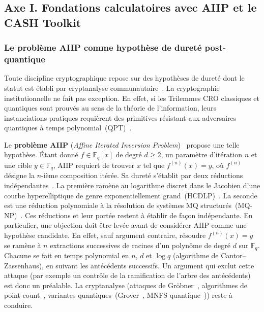 \subsection{Axe I. Fondations calculatoires avec AIIP et le CASH Toolkit}
\label{subsec:axe1_aiip_cash}
\begin{sloppypar}

\subsubsection{Le probl\`eme AIIP comme hypoth\`ese de duret\'e post-quantique}
\label{subsubsec:probleme_aiip}

Toute discipline cryptographique repose sur des hypoth\`eses de duret\'e dont
le statut est \'etabli par cryptanalyse
communautaire~\cite{Goldreich01,KatzLindell14}. La cryptographie
institutionnelle ne fait pas exception. En effet, si les Trilemmes CRO classiques et
quantiques sont prouv\'es au sens de la th\'eorie de l'information, leurs
instanciations pratiques requi\`erent des primitives r\'esistant aux
adversaires quantiques \`a temps polynomial~(QPT)~\cite{Boneh2011,Watrous2009}.

Le \textbf{probl\`eme AIIP} (\textit{Affine Iterated Inversion
Problem})~\cite{MINKA2025AIIP} propose une telle hypoth\`ese. \'Etant
donn\'e $f \in \mathbb{F}_q[x]$ de degr\'e $d \geq 2$, un param\`etre
d'it\'eration $n$ et une cible $y \in \mathbb{F}_q$, AIIP requiert de trouver
$x$ tel que $f^{(n)}(x) = y$, o\`u $f^{(n)}$ d\'esigne la $n$-i\`eme
composition it\'er\'ee. Sa duret\'e s'\'etablit par deux r\'eductions
ind\'ependantes~\cite{MINKA2025AIIP}. La premi\`ere ram\`ene au logarithme discret dans
le Jacobien d'une courbe hyperelliptique de genre exponentiellement
grand~(HCDLP)~\cite{Menezes2001,Enge2002}. La seconde est une r\'eduction polynomiale \`a la
r\'esolution de syst\`emes MQ structur\'es~(MQ-NP)~\cite{Courtois2000,Ding2004}.
Ces r\'eductions et leur port\'ee restent \`a \'etablir de fa\c{c}on
ind\'ependante. En particulier, une objection doit \^etre lev\'ee avant de
consid\'erer AIIP comme une hypoth\`ese candidate. En effet, sauf argument contraire,
r\'esoudre $f^{(n)}(x) = y$ se ram\`ene \`a $n$ extractions successives de racines
d'un polyn\^ome de degr\'e $d$ sur $\mathbb{F}_q$. Chacune se fait en temps
polynomial en $n$, $d$ et $\log q$ (algorithme de Cantor--Zassenhaus), en
suivant les ant\'ec\'edents successifs. Un argument qui exclut cette attaque
(par exemple un contr\^ole de la ramification de l'arbre des ant\'ec\'edents)
est donc un pr\'ealable. La cryptanalyse (attaques de
Gr\"obner~\cite{Faugere02,Faugere99}, algorithmes de
point-count~\cite{Schoof85,Kedlaya2001}, variantes
quantiques~(Grover~\cite{Grover96}, MNFS quantique~\cite{Jeppesen2022}))
reste \`a conduire.


\end{sloppypar}
